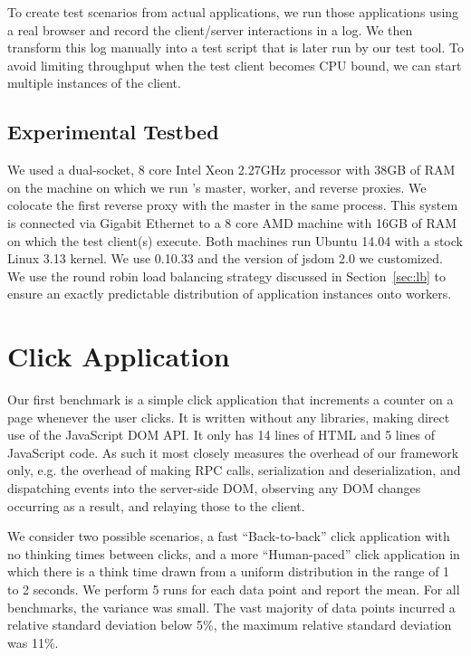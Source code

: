To create test scenarios from actual applications,
we run those applications using a real browser and record the client/server interactions
in a log.  We then transform this log manually into a test script that is later run 
by our test tool.  To avoid limiting throughput when the test client becomes CPU bound,
we can start multiple instances of the client.



\subsection{Experimental Testbed}
We used a dual-socket, 8 core Intel Xeon 2.27GHz processor with 38GB of RAM on
the machine on which we run \cbtwo{}'s master, worker, and reverse proxies.
We colocate the first reverse proxy with the master in the same process. This
system is connected via Gigabit Ethernet to a 8 core AMD machine with 16GB of
RAM on which the test client(s) execute. Both machines run  Ubuntu 14.04 with
a stock Linux 3.13 kernel.  We use \nodejs{} 0.10.33 and the version of jsdom
2.0 we customized.  We use the round robin load balancing strategy discussed in
Section~\ref{sec:lb} to ensure an exactly predictable distribution
of application instances onto workers.

%
%

\section{Click Application}
Our first benchmark is a simple click application that increments a counter on a page
whenever the user clicks.  It is written without any libraries, making direct use of
the JavaScript DOM API.  It only has 14 lines of HTML and 5 lines of JavaScript code.
As such it most closely measures the overhead of our
framework only, e.g. the overhead of making RPC calls, serialization and deserialization,
and dispatching events into the server-side DOM, observing any DOM changes occurring as
a result, and relaying those to the client.

We consider two possible scenarios, a fast ``Back-to-back'' click application 
with no thinking times between clicks, and a more ``Human-paced'' click application
in which there is a think time drawn from a uniform distribution in the range of
1 to 2 seconds.  We perform 5 runs for each data point and report the mean.
For all benchmarks, the variance was small. The vast majority of data points incurred
a relative standard deviation below 5\%, the maximum relative standard deviation was 11\%.

